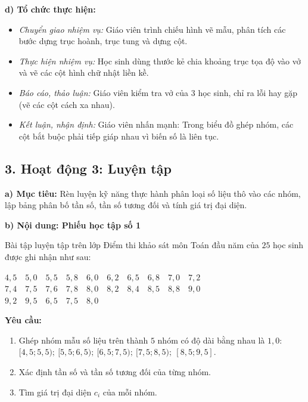 \documentclass[12pt, a4paper]{article}
\begin{document}
\noindent \textbf{d) Tổ chức thực hiện:}
\begin{itemize}[leftmargin=0.8cm]
    \item \textit{Chuyển giao nhiệm vụ:} Giáo viên trình chiếu hình vẽ mẫu, phân tích các bước dựng trục hoành, trục tung và dựng cột.
    \item \textit{Thực hiện nhiệm vụ:} Học sinh dùng thước kẻ chia khoảng trục tọa độ vào vở và vẽ các cột hình chữ nhật liền kề.
    \item \textit{Báo cáo, thảo luận:} Giáo viên kiểm tra vở của 3 học sinh, chỉ ra lỗi hay gặp (vẽ các cột cách xa nhau).
    \item \textit{Kết luận, nhận định:} Giáo viên nhấn mạnh: Trong biểu đồ ghép nhóm, các cột bắt buộc phải tiếp giáp nhau vì biến số là liên tục.
\end{itemize}

\subsection*{3. Hoạt động 3: Luyện tập}

\noindent \textbf{a) Mục tiêu:}
Rèn luyện kỹ năng thực hành phân loại số liệu thô vào các nhóm, lập bảng phân bố tần số, tần số tương đối và tính giá trị đại diện.

\noindent \textbf{b) Nội dung: Phiếu học tập số 1}
\begin{pedabox}{Bài tập luyện tập trên lớp}
Điểm thi khảo sát môn Toán đầu năm của $25$ học sinh được ghi nhận như sau:
\begin{center}
$4{,}5 \quad 5{,}0 \quad 5{,}5 \quad 5{,}8 \quad 6{,}0 \quad 6{,}2 \quad 6{,}5 \quad 6{,}8 \quad 7{,}0 \quad 7{,}2$ \\
$7{,}4 \quad 7{,}5 \quad 7{,}6 \quad 7{,}8 \quad 8{,}0 \quad 8{,}2 \quad 8{,}4 \quad 8{,}5 \quad 8{,}8 \quad 9{,}0$ \\
$9{,}2 \quad 9{,}5 \quad 6{,}5 \quad 7{,}5 \quad 8{,}0$
\end{center}
\textbf{Yêu cầu:}
\begin{enumerate}[leftmargin=0.6cm]
    \item Ghép nhóm mẫu số liệu trên thành $5$ nhóm có độ dài bằng nhau là $1{,}0$:
    $[4{,}5; 5{,}5); \ [5{,}5; 6{,}5); \ [6{,}5; 7{,}5); \ [7{,}5; 8{,}5); \ [8{,}5; 9{,}5]$.
    \item Xác định tần số và tần số tương đối của từng nhóm.
    \item Tìm giá trị đại diện $c_i$ của mỗi nhóm.
\end{enumerate}
\end{pedabox}
\end{document}
